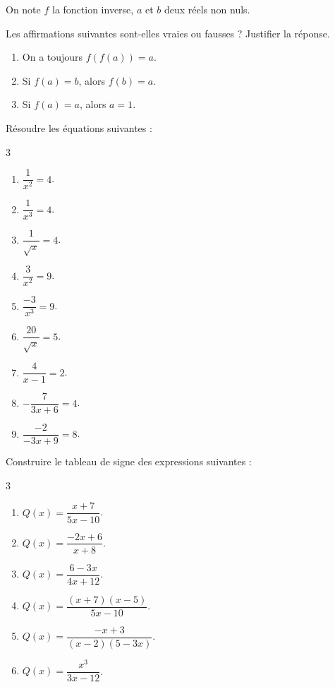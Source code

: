 \exo

On note $f$ la fonction inverse, $a$ et $b$ deux réels non nuls.

Les affirmations suivantes sont-elles vraies ou fausses ? Justifier la réponse.

\begin{enumerate}
\item On a toujours $f(f(a))=a$.
\smallskip
\item Si $f(a)=b$, alors $f(b)=a$.
\smallskip
\item Si $f(a)=a$, alors $a=1$.
\end{enumerate}

\exo

Résoudre les équations suivantes :

\vspace{-6pt}
\setlength{\columnsep}{1cm}
\setlength{\columnseprule}{0pt}
\begin{multicols}{3}
\begin{enumerate}
\item $\dfrac{1}{x^2}=4$.
\medskip
\item $\dfrac{1}{x^3}=4$.
\medskip
\item $\dfrac{1}{\sqrt{x}}=4$.
\medskip
\item $\dfrac{3}{x^2}=9$.
\medskip
\item $\dfrac{-3}{x^3}=9$.
\medskip
\item $\dfrac{20}{\sqrt{x}}=5$.
\medskip
\item $\dfrac{4}{x-1}=2$.
\medskip
\item $-\dfrac{7}{3x+6}=4$.
\medskip
\item $\dfrac{-2}{-3x+9}=8$.
\medskip
\end{enumerate}
\end{multicols}
\vspace{-6pt}

\exo

Construire le tableau de signe des expressions suivantes :

\vspace{-6pt}
\setlength{\columnsep}{1cm}
\setlength{\columnseprule}{0pt}
\begin{multicols}{3}
\begin{enumerate}
\item $Q(x)=\dfrac{x+7}{5x-10}$.
\medskip
\item $Q(x)=\dfrac{-2x+6}{x+8}$.
\medskip
\item $Q(x)=\dfrac{6-3x}{4x+12}$.
\medskip
\item $Q(x)=\dfrac{(x+7)(x-5)}{5x-10}$.
\medskip
\item $Q(x)=\dfrac{-x+3}{(x-2)(5-3x)}$.
\medskip
\item $Q(x)=\dfrac{x^3}{3x-12}$.
\medskip
\end{enumerate}
\end{multicols}
\vspace{-6pt}

